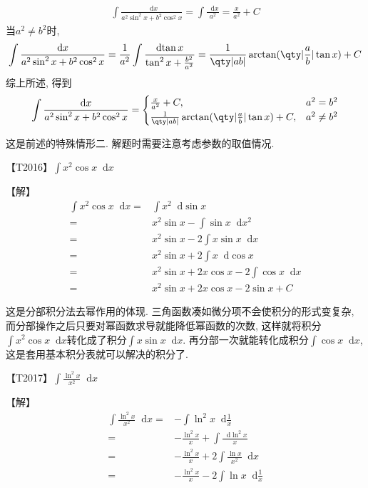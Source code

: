 \documentclass{ctexbook}
\newcommand*{\dif}{\mathop{}\!\mathrm{d}}
\begin{document}
{\begin{align*}
\int\frac{\dif{x}}{a^{2}\sin^{2}{x}+b^{2}\cos^{2}{x}}=\int\frac{\dif{x}}{a^{2}}=\frac{x}{a^{2}}+C
\end{align*}
当$a^{2}\ne b^{2}$时, 
\begin{align*}
\int\frac{\dif{x}}{a^{2}\sin^{2}{x}+b^{2}\cos^{2}{x}}=\frac{1}{a^{2}}\int\frac{\dif{\tan{x}}}{\tan^{2}{x}+\frac{b^{2}}{a^{2}}}=\frac{1}{\qty|ab|}\arctan(\qty|\frac{a}{b}|\tan{x})+C
\end{align*}
综上所述, 得到
\begin{align*}
\int\frac{\dif{x}}{a^{2}\sin^{2}{x}+b^{2}\cos^{2}{x}}=\begin{cases}
\frac{x}{a^{2}}+C,&a^{2}=b^{2}\\
\frac{1}{\qty|ab|}\arctan(\qty|\frac{a}{b}|\tan{x})+C,&a^{2}\ne b^{2}
\end{cases}
\end{align*}\par
{\kaishu 这是前述的特殊情形二. 解题时需要注意考虑参数的取值情况. \par}
{\color{red}【T2016】}$\int x^{2}\cos{x}\dif{x}$\par
【解】
\begin{align*}
\int x^{2}\cos{x}\dif{x}={}&\int x^{2}\dif{\sin{x}}\\
={}&x^{2}\sin{x}-\int\sin{x}\dif{x^{2}}\\
={}&x^{2}\sin{x}-2\int x\sin{x}\dif{x}\\
={}&x^{2}\sin{x}+2\int x\dif{\cos{x}}\\
={}&x^{2}\sin{x}+2x\cos{x}-2\int\cos{x}\dif{x}\\
={}&x^{2}\sin{x}+2x\cos{x}-2\sin{x}+C
\end{align*}\par
{\kaishu 这是分部积分法去幂作用的体现. 三角函数凑如微分项不会使积分的形式变复杂, 而分部操作之后只要对幂函数求导就能降低幂函数的次数, 这样就将积分$\int x^{2}\cos{x}\dif{x}$转化成了积分$\int x\sin{x}\dif{x}$. 再分部一次就能转化成积分$\int\cos{x}\dif{x}$, 这是套用基本积分表就可以解决的积分了. \par}
{\color{red}【T2017】}$\int\frac{\ln^{2}{x}}{x^{2}}\dif{x}$\par
【解】
\begin{align*}
\int\frac{\ln^{2}{x}}{x^{2}}\dif{x}={}&-\int\ln^{2}{x}\dif{\frac{1}{x}}\\
={}&-\frac{\ln^{2}{x}}{x}+\int\frac{\dif{\ln^{2}{x}}}{x}\\
={}&-\frac{\ln^{2}{x}}{x}+2\int\frac{\ln{x}}{x^{2}}\dif{x}\\
={}&-\frac{\ln^{2}{x}}{x}-2\int\ln{x}\dif{\frac{1}{x}}\\

\end{align*}}
\end{document}
